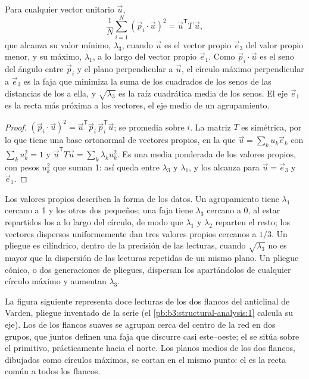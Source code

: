 \begin{theorem}\label{thm:b3:structural-analysis:tensor}
Para cualquier vector unitario $\vec u$,
\[
  \frac1N\sum_{i=1}^N (\vec p_i\cdot\vec u)^2 = \vec u^{\mathsf T}T\,\vec u ,
\]
que alcanza su valor mínimo, $\lambda_3$, cuando $\vec u$ es el vector propio
$\vec e_3$ del valor propio menor, y su máximo, $\lambda_1$, a lo largo del
vector propio $\vec e_1$. Como $\vec p_i\cdot\vec u$ es el seno del ángulo
entre $\vec p_i$ y el plano perpendicular a $\vec u$, el círculo máximo
perpendicular a $\vec e_3$ es la faja que minimiza la suma de los cuadrados
de los senos de las distancias de los  a ella, y $\sqrt{\lambda_3}$ es la
raíz cuadrática media de los senos. El eje $\vec e_1$ es la recta más próxima a los vectores,
el eje medio de un agrupamiento.
\end{theorem}

\begin{proof}
$(\vec p_i\cdot\vec u)^2 = \vec u^{\mathsf T}\vec p_i\,\vec p_i^{\mathsf T}\vec
u$; se promedia sobre $i$. La matriz $T$ es simétrica, por lo que tiene una base ortonormal
de vectores propios, en la que $\vec u = \sum_k u_k\vec e_k$ con $\sum_k
u_k^2 = 1$ y $\vec u^{\mathsf T}T\vec u = \sum_k\lambda_k u_k^2$. Es una
media ponderada de los valores propios, con pesos $u_k^2$ que suman 1: así
queda entre $\lambda_3$ y $\lambda_1$, y los alcanza para $\vec u = \vec
e_3$ y $\vec e_1$.
\end{proof}

Los valores propios describen la forma de los datos. Un agrupamiento tiene $\lambda_1$ cercano a
1 y los otros dos pequeños; una faja tiene $\lambda_3$ cercano a 0, al estar repartidos los 
a lo largo del círculo, de modo que $\lambda_1$ y $\lambda_2$ reparten el resto;
los vectores dispersos uniformemente dan tres valores propios cercanos a $1/3$. Un pliegue es
cilíndrico, dentro de la precisión de las lecturas, cuando $\sqrt{\lambda_3}$ no es
mayor que la dispersión de las lecturas repetidas de un mismo plano. Un pliegue cónico,
o dos generaciones de pliegues, dispersan los  apartándolos de cualquier círculo máximo
y aumentan $\lambda_3$.

La figura siguiente representa doce lecturas de los dos flancos del
anticlinal de Varden, pliegue inventado de la serie (el \cref{pb:b3:structural-analysis:1}
calcula su eje). Los  de los flancos suaves se agrupan cerca del centro de
la red en dos grupos, que juntos definen una faja que discurre casi
este--oeste; el  se sitúa sobre el primitivo, prácticamente hacia el norte. Los planos medios
de los dos flancos, dibujados como círculos máximos, se cortan en el mismo punto:
el  es la recta común a todos los flancos.


